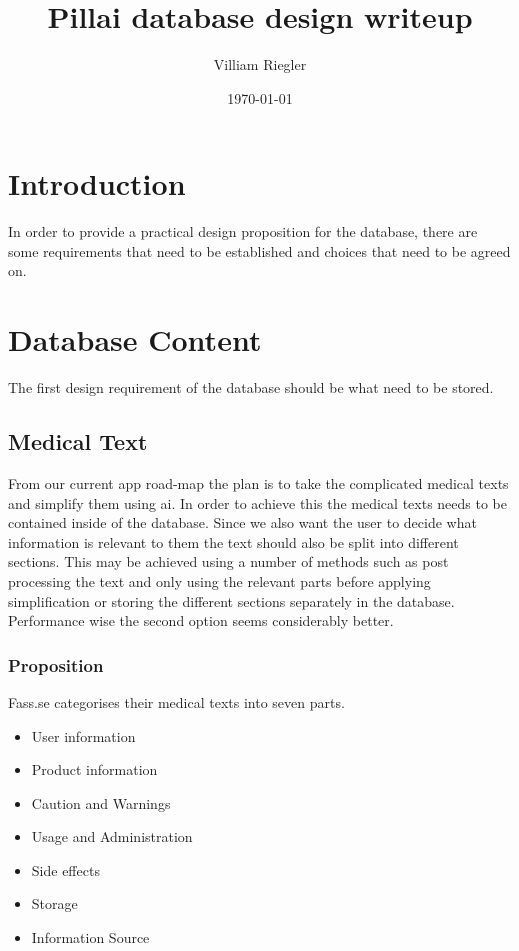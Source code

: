 \documentclass{article}
\title{Pillai database design writeup}
\author{Villiam Riegler}
\date{\today}
\begin{document}
\maketitle
\newpage
\tableofcontents 
\newpage 
{}


\section{Introduction}

In order to provide a practical design proposition for the database, there are some requirements that need to be established and choices that need to be agreed on. 

\section{Database Content}

The first design requirement of the database should be what need to be stored. 

\subsection{Medical Text}

From our current app road-map the plan is to take the complicated medical texts and simplify them using ai. In order to achieve this the medical texts needs to be contained inside of the database. Since we also want the user to decide what information is relevant to them the text should also be split into different sections. This may be achieved using a number of methods such as post processing the text and only using the relevant parts before applying simplification or storing the different sections separately in the database. Performance wise the second option seems considerably better. 

\subsubsection{Proposition}

Fass.se categorises their medical texts into seven parts.
\begin{itemize}
    \item User information
    \item Product information
    \item Caution and Warnings
    \item Usage and Administration
    \item Side effects
    \item Storage
    \item Information Source
\end{itemize}
\end{document}
